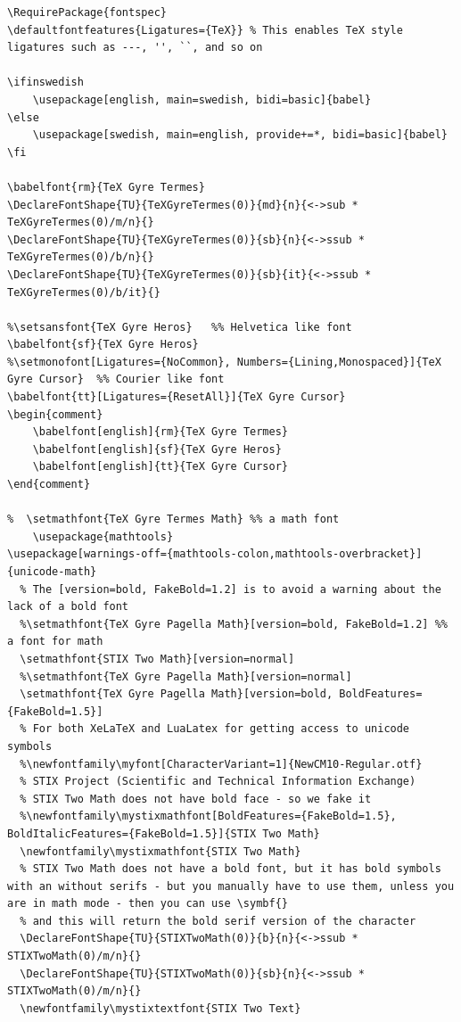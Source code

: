\documentclass[12pt, twoside]{article}
\newif\ifinswedish
\begin{document}
\begin{lstlisting}[style=latexExampleForAuthors, caption={The main fonts used in the template in addition to Figtree}, label=lst:FontsUsed]
\RequirePackage{fontspec}
\defaultfontfeatures{Ligatures={TeX}} % This enables TeX style ligatures such as ---, '', ``, and so on

\ifinswedish
    \usepackage[english, main=swedish, bidi=basic]{babel}
\else
    \usepackage[swedish, main=english, provide+=*, bidi=basic]{babel}
\fi

\babelfont{rm}{TeX Gyre Termes}
\DeclareFontShape{TU}{TeXGyreTermes(0)}{md}{n}{<->sub * TeXGyreTermes(0)/m/n}{}
\DeclareFontShape{TU}{TeXGyreTermes(0)}{sb}{n}{<->ssub * TeXGyreTermes(0)/b/n}{}
\DeclareFontShape{TU}{TeXGyreTermes(0)}{sb}{it}{<->ssub * TeXGyreTermes(0)/b/it}{}
  
%\setsansfont{TeX Gyre Heros}   %% Helvetica like font
\babelfont{sf}{TeX Gyre Heros}
%\setmonofont[Ligatures={NoCommon}, Numbers={Lining,Monospaced}]{TeX Gyre Cursor}  %% Courier like font
\babelfont{tt}[Ligatures={ResetAll}]{TeX Gyre Cursor}
\begin{comment}
    \babelfont[english]{rm}{TeX Gyre Termes}
    \babelfont[english]{sf}{TeX Gyre Heros}
    \babelfont[english]{tt}{TeX Gyre Cursor}
\end{comment}

%  \setmathfont{TeX Gyre Termes Math} %% a math font
    \usepackage{mathtools}
\usepackage[warnings-off={mathtools-colon,mathtools-overbracket}]{unicode-math}
  % The [version=bold, FakeBold=1.2] is to avoid a warning about the lack of a bold font
  %\setmathfont{TeX Gyre Pagella Math}[version=bold, FakeBold=1.2] %% a font for math
  \setmathfont{STIX Two Math}[version=normal]
  %\setmathfont{TeX Gyre Pagella Math}[version=normal]
  \setmathfont{TeX Gyre Pagella Math}[version=bold, BoldFeatures={FakeBold=1.5}]
  % For both XeLaTeX and LuaLatex for getting access to unicode symbols
  %\newfontfamily\myfont[CharacterVariant=1]{NewCM10-Regular.otf}
  % STIX Project (Scientific and Technical Information Exchange)
  % STIX Two Math does not have bold face - so we fake it
  %\newfontfamily\mystixmathfont[BoldFeatures={FakeBold=1.5}, BoldItalicFeatures={FakeBold=1.5}]{STIX Two Math}
  \newfontfamily\mystixmathfont{STIX Two Math}
  % STIX Two Math does not have a bold font, but it has bold symbols with an without serifs - but you manually have to use them, unless you are in math mode - then you can use \symbf{}
  % and this will return the bold serif version of the character
  \DeclareFontShape{TU}{STIXTwoMath(0)}{b}{n}{<->ssub * STIXTwoMath(0)/m/n}{}
  \DeclareFontShape{TU}{STIXTwoMath(0)}{sb}{n}{<->ssub * STIXTwoMath(0)/m/n}{}
  \newfontfamily\mystixtextfont{STIX Two Text}


\end{lstlisting}
\end{document}
